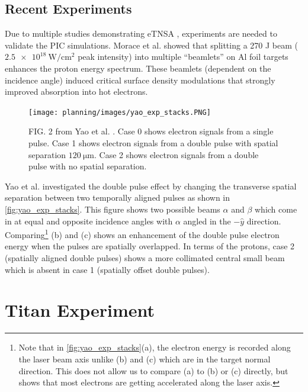 
\subsection{Recent Experiments}

Due to multiple studies demonstrating \gls{eTNSA} \cite{Ferri_2019_Nat_Comm,Rahman_2021_PoP,Khan_2024_NJoP}, experiments are needed to validate the \gls{PIC} simulations. Morace et al. \cite{Morace_2019_Nat_Comm} showed that splitting a 270 J beam ($\SI{2.5e18}{\watt \per \centi \meter \squared}$ peak intensity) into multiple ``beamlets'' on Al foil targets enhances the proton energy spectrum. These beamlets (dependent on the incidence angle) induced critical surface density modulations that strongly improved absorption into hot electrons. 

\begin{figure}
	\centering 
	\texttt{[image: planning/images/yao\_exp\_stacks.PNG]}
	\caption{FIG. 2 from Yao et al. \cite{Yao_2024_MaRaE}. Case 0 shows electron signals from a single pulse. Case 1 shows electron signals from a double pulse with spatial separation $\SI{120}{\micro \meter}$. Case 2 shows electron signals from a double pulse with no spatial separation.}
	\label{fig:yao_exp_stacks}
\end{figure}

Yao et al. \cite{Yao_2024_MaRaE} investigated the double pulse effect by changing the transverse spatial separation between two temporally aligned pulses as shown in \autoref{fig:yao_exp_stacks}. This figure shows two possible beams $\alpha$ and $\beta$ which come in at equal and opposite incidence angles with $\alpha$ angled in the $-\hat{y}$ direction. Comparing\footnote{Note that in \autoref{fig:yao_exp_stacks}(a), the electron energy is recorded along the laser beam axis unlike (b) and (c) which are in the target normal direction. This does not allow us to compare (a) to (b) or (c) directly, but shows that most electrons are getting accelerated along the laser axis.} (b) and (c) shows an enhancement of the double pulse electron energy when the pulses are spatially overlapped. In terms of the protons, case 2 (spatially aligned double pulses) shows a more collimated central small beam which is absent in case 1 (spatially offset double pulses).

\section{Titan Experiment} \label{sec:titan_experiment}


